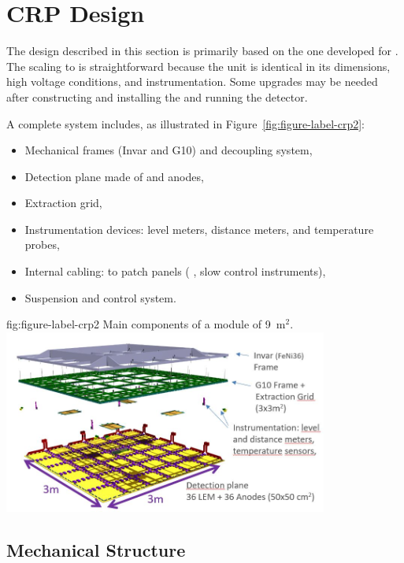 \section{CRP Design}
\label{ch:dp-crp-design}
The design described in this section is primarily based on the one developed for . The scaling to   is straightforward because the  unit is identical in its dimensions, high voltage conditions, and instrumentation. Some upgrades may be needed after constructing and installing the  and running the detector.

A complete  system includes, as illustrated in Figure~\ref{fig:figure-label-crp2}:
\begin{itemize}
\item Mechanical frames (Invar and G10) and decoupling system,
\item Detection plane made of  and anodes,
\item Extraction grid,
\item Instrumentation devices: level meters, distance meters, and temperature probes,
\item Internal cabling: to patch panels ( , slow control instruments),
\item Suspension and control system.
\end{itemize}

\begin{dunefigure}{fig:figure-label-crp2}
{Main components of a  module of  \SI{9}{m$^{2}$}.}
\includegraphics[width=0.8\textwidth]{graphics/CRP-design-components}
\end{dunefigure}

\subsection{Mechanical Structure}
\label{sec:fddp-crp-mechanics}
